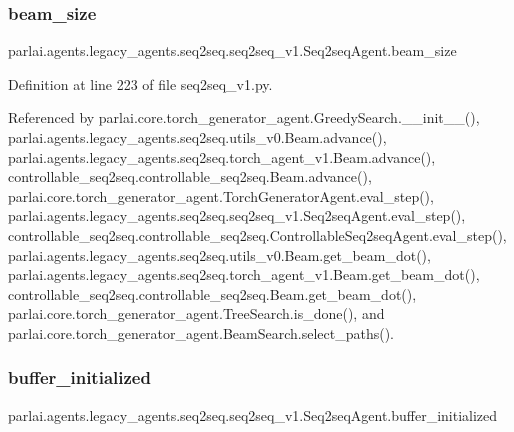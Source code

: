 \subsubsection{\texorpdfstring{beam\+\_\+size}{beam\_size}}
{\footnotesize\ttfamily parlai.\+agents.\+legacy\+\_\+agents.\+seq2seq.\+seq2seq\+\_\+v1.\+Seq2seq\+Agent.\+beam\+\_\+size}



Definition at line 223 of file seq2seq\+\_\+v1.\+py.



Referenced by parlai.\+core.\+torch\+\_\+generator\+\_\+agent.\+Greedy\+Search.\+\_\+\+\_\+init\+\_\+\+\_\+(), parlai.\+agents.\+legacy\+\_\+agents.\+seq2seq.\+utils\+\_\+v0.\+Beam.\+advance(), parlai.\+agents.\+legacy\+\_\+agents.\+seq2seq.\+torch\+\_\+agent\+\_\+v1.\+Beam.\+advance(), controllable\+\_\+seq2seq.\+controllable\+\_\+seq2seq.\+Beam.\+advance(), parlai.\+core.\+torch\+\_\+generator\+\_\+agent.\+Torch\+Generator\+Agent.\+eval\+\_\+step(), parlai.\+agents.\+legacy\+\_\+agents.\+seq2seq.\+seq2seq\+\_\+v1.\+Seq2seq\+Agent.\+eval\+\_\+step(), controllable\+\_\+seq2seq.\+controllable\+\_\+seq2seq.\+Controllable\+Seq2seq\+Agent.\+eval\+\_\+step(), parlai.\+agents.\+legacy\+\_\+agents.\+seq2seq.\+utils\+\_\+v0.\+Beam.\+get\+\_\+beam\+\_\+dot(), parlai.\+agents.\+legacy\+\_\+agents.\+seq2seq.\+torch\+\_\+agent\+\_\+v1.\+Beam.\+get\+\_\+beam\+\_\+dot(), controllable\+\_\+seq2seq.\+controllable\+\_\+seq2seq.\+Beam.\+get\+\_\+beam\+\_\+dot(), parlai.\+core.\+torch\+\_\+generator\+\_\+agent.\+Tree\+Search.\+is\+\_\+done(), and parlai.\+core.\+torch\+\_\+generator\+\_\+agent.\+Beam\+Search.\+select\+\_\+paths().

\mbox{\label{classparlai_1_1agents_1_1legacy__agents_1_1seq2seq_1_1seq2seq__v1_1_1Seq2seqAgent_ae4bcab12b2cf1070cc8f712956f886ca}} 
\subsubsection{\texorpdfstring{buffer\+\_\+initialized}{buffer\_initialized}}
{\footnotesize\ttfamily parlai.\+agents.\+legacy\+\_\+agents.\+seq2seq.\+seq2seq\+\_\+v1.\+Seq2seq\+Agent.\+buffer\+\_\+initialized}



